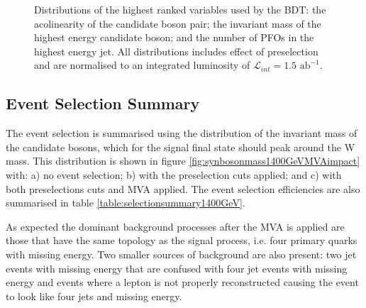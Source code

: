 \begin{figure}[h!]
\caption[Distributions of the highest ranked variables used by the BDT: \protect{} the acolinearity of the candidate boson pair; \protect{} the invariant mass of the highest energy candidate boson; and \protect{} the number of PFOs in the highest energy jet.  All distributions includes effect of preselection and are normalised to an integrated luminosity of $\mathcal{L}_{int} = 1.5\text{ ab}^{-1}$.]{{Distributions of the highest ranked variables used by the BDT: \protect{} the acolinearity of the candidate boson pair; \protect{} the invariant mass of the highest energy candidate boson; and \protect{} the number of PFOs in the highest energy jet.  All distributions includes effect of preselection and are normalised to an integrated luminosity of $\mathcal{L}_{int} = 1.5\text{ ab}^{-1}$.}}
\label{fig:rankingvariables}
\end{figure}


\subsection{Event Selection Summary}
\label{sec:eventselsummary1400GeV}
The event selection is summarised using the distribution of the invariant mass of the candidate bosons, which for the signal final state should peak around the W mass.  This distribution is shown in figure \ref{fig:synbosonmass1400GeVMVAimpact} with: a) no event selection; b) with the preselection cuts applied; and c) with both preselections cuts and MVA applied.  The event selection efficiencies are also summarised in table \ref{table:selectionsummary1400GeV}.

As expected the dominant background processes after the MVA is applied are those that have the same topology as the signal process, i.e. four primary quarks with missing energy.  Two smaller sources of background are also present: two jet events with missing energy that are confused with four jet events with missing energy and events where a lepton is not properly reconstructed causing the event to look like four jets and missing energy.  

